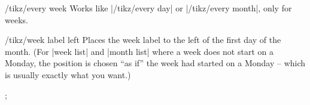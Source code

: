 \begin{stylekey}{/tikz/every week}
  Works like |/tikz/every day| or |/tikz/every month|, only for weeks.
\end{stylekey}

\begin{stylekey}{/tikz/week label left}
    Places the week label to the left of the first day of the month. (For
    |week list| and |month list| where a week does not start on a Monday, the
    position is chosen ``as if'' the week had started on a Monday --  which is
    usually exactly what you want.)
\begin{codeexample}[preamble={\usetikzlibrary{ext.calendar-plus}}]
\tikz
  \calendar [week list, month label above centered,
             dates=2022-07-01 to 2022-07-31,
             week label left,
             every week/.append style={gray!50!black,font=\sffamily}];
\end{codeexample}
\end{stylekey}